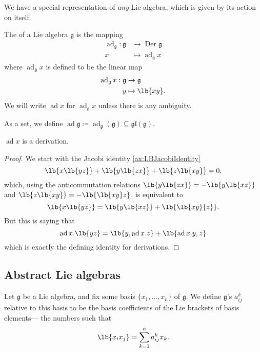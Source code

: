 \documentclass{article}
\DeclarePairedDelimiter\lb\lbrack\rbrack
\DeclareMathOperator{\Der}{Der}
\newcommand*\ad{\operatorname{ad}}
\newcommand*\frkg{{\ensuremath{\mathfrak{g}}}}
\newcommand*\gl{\ensuremath{\mathfrak{gl}}}
\newcommand*\acts{.}
\begin{document}
We have a special representation of \textit{any} Lie algebra, which is given by its action on itself.

\begin{definition}
    The  of a Lie algebra $\frkg$ is the mapping
    \begin{align*}
        \ad_\frkg:
        \frkg 
        &\to
        \Der \frkg
        \\
        x 
        &\mapsto 
        \ad_\frkg x
    \end{align*}
    where $\ad_\frkg x$ is defined to be the linear map
    \begin{align*}
        \ad_\frkg x: 
        \frkg 
        &\to 
        \frkg \\
        y 
        &\mapsto
        \lb{xy}.
    \end{align*}
    We will write $\ad x$ for $\ad_\frkg x$ unless there is any ambiguity.

    As a set, we define $\ad \frkg \coloneq \ad_\frkg(\frkg) \subseteq \gl(\frkg)$.
\end{definition}

\begin{proposition}
    $\ad x$ is a derivation.
\end{proposition}
\begin{proof}
    We start with the Jacobi identity \ref{ax:LBJacobiIdentity}
    \[
        \lb{x\lb{yz}} + \lb{y\lb{zx}} + \lb{z\lb{xy}}
        =
        0,
    \]
    which, using the anticommutation relations $\lb{y\lb{zx}} = -\lb{y\lb{xz}}$ and $\lb{z\lb{xy}} = -\lb{\lb{xy}z}$, is equivalent to
    \[
        \lb{x\lb{yz}}
        =
        \lb{y\lb{xz}} + \lb{\lb{xy}{z}}.
    \]
    But this is saying that
    \[
        \ad x \acts \lb{yz}
        =
        \lb{y, \ad x \acts z}
        +
        \lb{\ad x \acts y, z}
    \]
    which is exactly the defining identity for derivations.
\end{proof}


\subsection{Abstract Lie algebras}

\begin{definition}
    Let $\frkg$ be a Lie algebra, and fix some basis $\{x_1,\ldots,x_n\}$ of $\frkg$.
    We define $\frkg$'s  $a^k_{ij}$ relative to this basis to be the basis coefficients of the Lie brackets of basis elements--- the numbers such that
    \[
        \lb{x_ix_j}
        =
        \sum_{k=1}^n
        a^k_{ij}
        x_k.
    \]
\end{definition}
\end{document}
